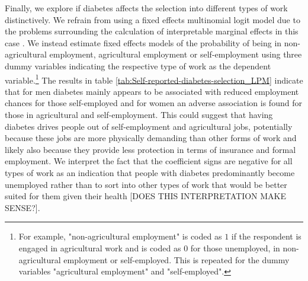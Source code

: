\documentclass[12pt,english,british]{article}
\begin{document}
Finally, we explore if diabetes affects the selection into different types of work distinctively. We refrain from using a fixed effects multinomial logit model due to the problems surrounding the calculation of interpretable marginal effects in this case \citep{Pforr2014}. We instead estimate fixed effects models of the probability of being in non-agricultural employment, agricultural employment or self-employment using three dummy variables indicating the respective type of work as the dependent variable.\footnote{For example, "non-agricultural employment" is coded as $1$ if the respondent is engaged in agricultural work and is coded as $0$ for those unemployed, in non-agricultural employment or self-employed. This is repeated for the dummy variables "agricultural employment" and "self-employed".} The results in table \ref{tab:Self-reported-diabetes-selection_LPM} indicate that for men diabetes mainly appears to be associated with reduced employment chances for those self-employed and for women an adverse association is found for those in agricultural and self-employment. This could suggest that having diabetes drives people out of self-employment and agricultural jobs, potentially because these jobs are more physically demanding than other forms of work and likely also because they provide less protection in terms of insurance and formal employment. We interpret the fact that the coefficient signs are negative for all types of work as an indication that people with diabetes predominantly become unemployed rather than to sort into other types of work that would be better suited for them given their health [DOES THIS INTERPRETATION MAKE SENSE?].
\end{document}
